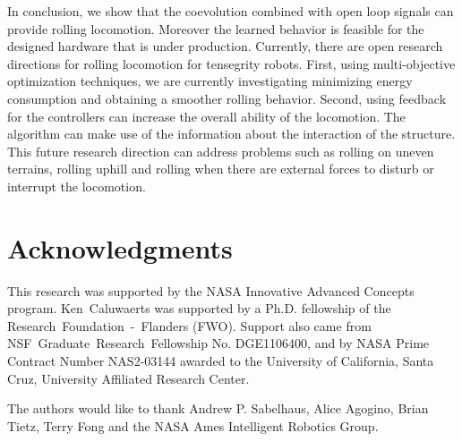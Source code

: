\documentclass[twocolumn,10pt]{asme2ej}
\begin{document}
In conclusion, we show that the coevolution combined with open loop signals can provide rolling locomotion. Moreover the learned behavior is feasible for the designed hardware that is under production. Currently, there are open research directions for rolling locomotion for tensegrity robots. First, using multi-objective optimization techniques, we are currently investigating minimizing energy consumption and obtaining a smoother rolling behavior. Second, using feedback for the controllers can increase the overall ability of the locomotion. The algorithm can make use of the information about the interaction of the structure. This future research direction can address problems such as rolling on uneven terrains, rolling uphill and rolling when there are external forces to disturb or interrupt the locomotion.



\section*{Acknowledgments}
This research was supported by the NASA Innovative Advanced Concepts program.
\mbox{Ken Caluwaerts} was supported by a {Ph.D.} fellowship of the \mbox{Research Foundation - Flanders} (FWO).  Support also came from \mbox{NSF Graduate Research Fellowship} No. DGE1106400, and by NASA Prime Contract Number NAS2-03144 awarded to the University of California, Santa Cruz, University Affiliated Research Center.

The authors would like to thank Andrew P. Sabelhaus, Alice Agogino,  Brian Tietz, Terry Fong and the NASA Ames Intelligent Robotics Group.



\end{document}
